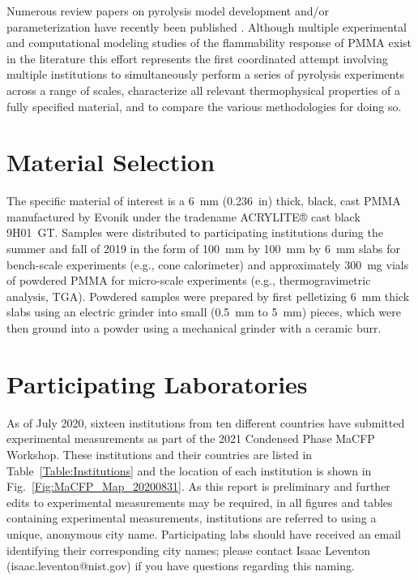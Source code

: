 \documentclass{book}
\begin{document}
Numerous review papers on pyrolysis model development and/or parameterization have recently been published \cite{nyazika2019pyrolysis,rogaume2019thermal, stoliarov2016parameterization,matala2012generalized}. Although multiple experimental \cite{kashiwagi1982study, hirata1985thermal, tewarson1992fire, rhodes1996burning} and computational modeling studies of the flammability response of PMMA exist in the literature \cite{consalvi2008numerical, leventon2015flame, fukumoto2018large} this effort represents the first coordinated attempt involving multiple institutions to simultaneously perform a series of pyrolysis experiments across a range of scales, characterize all relevant thermophysical properties of a fully specified material, and to compare the various methodologies for doing so.

\section{Material Selection}

The specific material of interest is a 6~mm (0.236~in) thick, black, cast PMMA manufactured by Evonik under the tradename ACRYLITE® cast black 9H01~GT. Samples were distributed to participating institutions during the summer and fall of 2019 in the form of 100~mm by 100~mm by 6~mm slabs for bench-scale experiments (e.g., cone calorimeter) and approximately 300~mg vials of powdered PMMA for micro-scale experiments (e.g., thermogravimetric analysis, TGA). Powdered samples were prepared by first pelletizing 6~mm thick slabs using an electric grinder into small (0.5~mm to 5~mm) pieces, which were then ground into a powder using a mechanical grinder with a ceramic burr.

\section{Participating Laboratories}
\thispagestyle{fancy}
As of July 2020, sixteen institutions from ten different countries have submitted experimental measurements as part of the 2021 Condensed Phase MaCFP Workshop. These institutions and their countries are listed in Table~\ref{Table:Institutions} and the location of each institution is shown in Fig.~\ref{Fig:MaCFP_Map_20200831}. As this report is preliminary and further edits to experimental measurements may be required, in all figures and tables containing experimental measurements, institutions are referred to using a unique, anonymous city name. Participating labs should have received an email identifying their corresponding city names; please contact Isaac Leventon (isaac.leventon@nist.gov) if you have questions regarding this naming.
\end{document}
